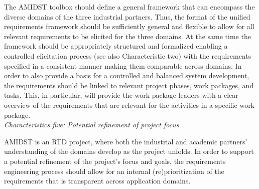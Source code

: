 The AMIDST toolbox should define a general framework that can encompass the diverse domains of the three industrial
partners. Thus, the format of the unified requirements framework should be sufficiently general and flexible to
allow for all relevant requirements to be elicited for the three domains. At the same time the framework should be
appropriately structured and formalized enabling a controlled elicitation process (see also Characteristic two) with the
requirements specified in a consistent manner making them comparable across domains. In order to also provide a basis 
for a controlled and
balanced system development, the requirements should be linked to
relevant project phases, work packages, and tasks. This, in particular, will provide the work package leaders with
a clear overview of the requirements that are relevant for the activities in a specific work package.   
%
%
\ \\
\noindent \emph{Characteristics five: Potential refinement of project focus}
\label{sec:characteristic5}

AMIDST is an RTD project, where both the industrial and academic partners' understanding of the domains develop as
the project unfolds. In order to support a potential refinement of the project's focus and goals, the requirements
engineering process should allow for an internal (re)prioritization of the requirements that is transparent across
application domains.    



%

